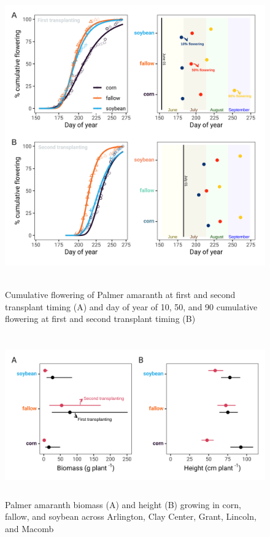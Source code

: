 \documentclass[utf8]{frontiersSCNS}
\begin{document}
\begin{figure}

{\centering \includegraphics[width=130mm,height=130mm]{../data analysis/figures/Figure 2} 

}

\caption{Cumulative flowering of Palmer amaranth at first and second transplant timing (A) and day of year of 10, 50, and 90 cumulative flowering at first and second transplant timing (B)}\label{fig:Figure-2}
\end{figure}

\begin{figure}

{\centering \includegraphics[width=130mm,height=70mm]{../data analysis/figures/Figure 3} 

}

\caption{Palmer amaranth biomass (A) and height (B) growing in corn, fallow, and soybean across Arlington, Clay Center, Grant, Lincoln, and Macomb}\label{fig:Figure-3}
\end{figure}
\end{document}
